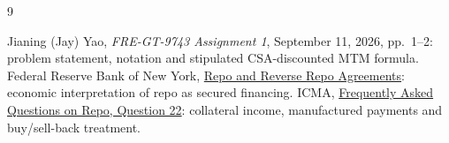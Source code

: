 \documentclass[11pt]{article}
\numberwithin{equation}{section}
\begin{document}
{}
\begin{thebibliography}{9}

 Jianing (Jay) Yao, \emph{FRE-GT-9743 Assignment 1}, September 11, 2026, pp.\ 1--2: problem statement, notation and stipulated CSA-discounted MTM formula.
 Federal Reserve Bank of New York, \href{https://www.newyorkfed.org/markets/domestic-market-operations/monetary-policy-implementation/repo-reverse-repo-agreements}{Repo and Reverse Repo Agreements}: economic interpretation of repo as secured financing.
 ICMA, \href{https://www.icmagroup.org/market-practice-and-regulatory-policy/repo-and-collateral-markets/icma-ercc-publications/frequently-asked-questions-on-repo/22-who-is-entitled-to-receive-coupons-dividends-or-other-income-payments-on-a-security-being-used-as-collateral-in-a-repo/}{Frequently Asked Questions on Repo, Question 22}: collateral income, manufactured payments and buy/sell-back treatment.

\end{thebibliography}
\end{document}
